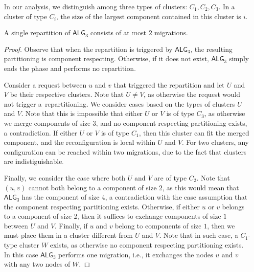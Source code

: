 \documentclass[manuscript,screen=true, review, anonymous]{acmart}
\newcommand{\TAlg}{{\ensuremath{\textsf{ALG}_{3}}}\xspace} %
\newcommand\maciek[1]{\color{brown}\textbf{\\ Maciek: #1}\color{black}}
\begin{document}



In our analysis, we distinguish among three types of clusters: $C_1, C_2, C_3$. In a cluster of type $C_i$, the size of the largest component contained in this cluster is $i$.

\begin{lemma}
  \label{lem:1req}
  A single repartition of \TAlg consists of at most $2$ migrations.
\end{lemma}

\begin{proof}
  Observe that when the repartition is triggered by \TAlg, the resulting partitioning is component respecting.
  Otherwise, if it does not exist, \TAlg simply ends the phase and performs no repartition.

  
    Consider a request between $u$ and $v$ that triggered the repartition and let $U$ and $V$ be their respective clusters.
    Note that $U\neq V$,
	 as otherwise the request would not trigger a~repartitioning.
	 We consider cases based on the types of clusters $U$ and $V$.
    Note that this is impossible that either $U$ or $V$ is of type $C_3$, as otherwise we merge components of size $3$, and no component respecting partitioning exists, a contradiction.
    If either $U$ or $V$ is of type $C_1$, then this cluster can fit the merged component, and the reconfiguration is local within $U$ and $V$.
    For two clusters, any configuration can be reached within two migrations, due to the fact that clusters are indistiguishable.
  
    Finally, we consider the case where both $U$ and $V$ are of type $C_2$. Note that $(u,v)$ cannot both belong to a component of size $2$, as this would mean that \TAlg has the component of size $4$, a contradiction with the case assumption that the component respecting partitioning exists. 
    Otherwise, if either $u$ or $v$ belongs to a component of size $2$, then it suffices to exchange components of size $1$ between $U$ and $V$.
    Finally, if $u$ and $v$ belong to components of size $1$, then we must place them in a cluster different from $U$ and $V$.
    Note that in such case, a $C_1$-type cluster $W$ exists, as otherwise no component respecting partitioning exists. In this case \TAlg performs one migration, i.e., it exchanges the nodes $u$ and $v$ with any two nodes of $W$.
\end{proof}
\end{document}
